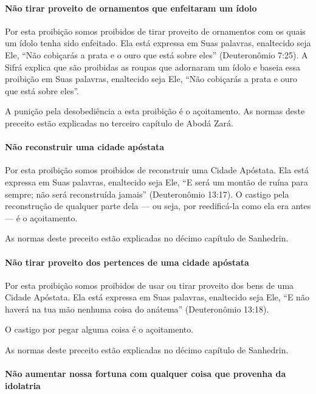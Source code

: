 \paragraph{Não tirar proveito de ornamentos que enfeitaram um ídolo}

Por esta proibição somos proibidos de tirar proveito de ornamentos com
os quais um ídolo tenha sido enfeitado. Ela está expressa em Suas
palavras, enaltecido seja Ele, ``Não cobiçarás a prata e o ouro que está
sobre eles'' (Deuteronômio 7:25). A Sifrá explica que são proibidas as
roupas que adornaram um ídolo e baseia essa proibição em Suas palavras,
enaltecido seja Ele, ``Não cobiçarás a prata e ouro que está sobre
eles''.

A punição pela desobediência a esta proibição é o açoitamento. As normas
deste preceito estão explicadas no terceiro capítulo de Abodá Zará.

\paragraph{Não reconstruir uma cidade apóstata}

Por esta proibição somos proibidos de reconstruir uma Cidade Apóstata.
Ela está expressa em Suas palavras, enaltecido seja Ele, ``E será um
montão de ruína para sempre; não será reconstruída jamais''
(Deuteronômio 13:17). O castigo pela reconstrução de qualquer parte dela
--- ou seja, por reedificá-la como ela era antes --- é o açoitamento.


As normas deste preceito estão explicadas no décimo capítulo de Sanhedrin.

\paragraph{Não tirar proveito dos pertences de uma cidade apóstata}

Por esta proibição somos proibidos de usar ou tirar proveito dos bens de
uma Cidade Apóstata. Ela está expressa em Suas palavras, enaltecido seja
Ele, ``E não haverá na tua mão nenhuma coisa do anátema'' (Deuteronômio
13:18).

O castigo por pegar alguma coisa é o açoitamento.

As normas deste preceito estão explicadas no décimo capítulo de Sanhedrin.

\paragraph{Não aumentar nossa fortuna com qualquer coisa que provenha da idolatria}

